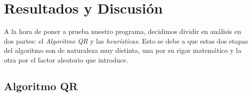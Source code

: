 \documentclass[a4paper]{article}
\begin{document}

\newpage

\section{Resultados y Discusión}

A la hora de poner a prueba nuestro programa, decidimos dividir en análisis en dos partes: el \textit{Algoritmo QR} y las \textit{heurísticas}. Esto se debe a que estas dos etapas del algoritmo son de naturaleza muy distinta, una por su rigor matemático y la otra por el factor  aleatorio que introduce.

\subsection{Algoritmo QR}
\end{document}
